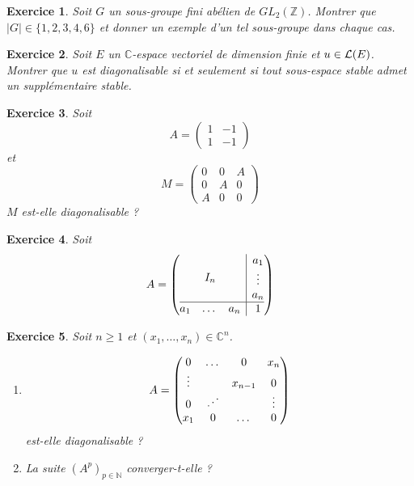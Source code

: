 \documentclass[12pt]{article}
\newtheorem{exercise}{Exercice}[section]
\theoremstyle{remark}
\theoremstyle{remark}
\newcommand{\C}{\mathbb{C}} \newcommand{\Q}{\mathbb{Q}}
\newcommand{\N}{\mathbb{N}} \newcommand{\Z}{\mathbb{Z}}
\begin{document}
\begin{exercise}
	Soit $G$ un sous-groupe fini abélien de $GL_{2}(\Z)$. Montrer que $\vert G\vert\in\{1,2,3,4,6\}$ et donner un exemple d'un tel sous-groupe dans chaque cas.
\end{exercise}

\begin{exercise}
	Soit $E$ un $\C$-espace vectoriel de dimension finie et $u\in\mathcal{L}(E)$. Montrer que $u$ est diagonalisable si et seulement si tout sous-espace stable admet un supplémentaire stable.
\end{exercise}

\begin{exercise}
	Soit 
	$$
	A=
	\begin{pmatrix}
		1 & -1\\
		1 & -1
	\end{pmatrix}
	$$
	et 
	$$
	M=
	\begin{pmatrix}
		0 & 0 & A\\
		0 & A & 0\\
		A & 0 & 0
	\end{pmatrix}
	$$
	$M$ est-elle diagonalisable ?
\end{exercise}

\begin{exercise}
	Soit
	$$
	A=
	\left(
		\begin{array}{@{}c|c@{}}
		I_{n} &
		\begin{matrix}
			a_{1}\\
			\vdots\\
			a_{n}
			\end{matrix}
			\\
		\hline
		\begin{matrix}
			a_{1} &
			\dots
			& a_{n}
			\end{matrix}
			& 1
		\end{array}
		\right)
	$$
\end{exercise}

\begin{exercise}
	Soit $n\geqslant1$ et $(x_{1},\dots,x_{n})\in\C^{n}$.
	\begin{enumerate}
		\item
		$$
		A=
		\begin{pmatrix}
			0 & \dots & 0 & x_{n}\\
			\vdots &  & x_{n-1} & 0\\
			0 & \reflectbox{$\ddots$} & & \vdots\\
			x_{1}& 0 &\dots & 0
		\end{pmatrix}
		$$
		est-elle diagonalisable ?
		\item La suite $(A^{p})_{p\in\N}$ converger-t-elle ?
	\end{enumerate}
\end{exercise}
\end{document}
